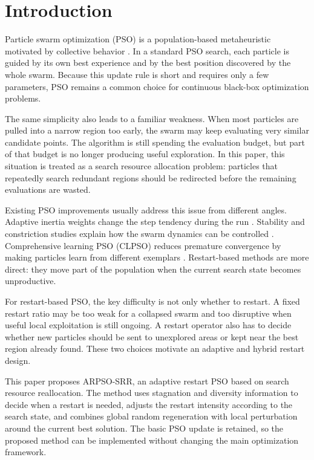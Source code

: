 \documentclass[conference]{IEEEtran}
\begin{document}
\section{Introduction}
Particle swarm optimization (PSO) is a population-based metaheuristic motivated by collective behavior \cite{b1}. In a standard PSO search, each particle is guided by its own best experience and by the best position discovered by the whole swarm. Because this update rule is short and requires only a few parameters, PSO remains a common choice for continuous black-box optimization problems.

The same simplicity also leads to a familiar weakness. When most particles are pulled into a narrow region too early, the swarm may keep evaluating very similar candidate points. The algorithm is still spending the evaluation budget, but part of that budget is no longer producing useful exploration. In this paper, this situation is treated as a search resource allocation problem: particles that repeatedly search redundant regions should be redirected before the remaining evaluations are wasted.

Existing PSO improvements usually address this issue from different angles. Adaptive inertia weights change the step tendency during the run \cite{b2}. Stability and constriction studies explain how the swarm dynamics can be controlled \cite{b3}. Comprehensive learning PSO (CLPSO) reduces premature convergence by making particles learn from different exemplars \cite{b4}. Restart-based methods are more direct: they move part of the population when the current search state becomes unproductive.

For restart-based PSO, the key difficulty is not only whether to restart. A fixed restart ratio may be too weak for a collapsed swarm and too disruptive when useful local exploitation is still ongoing. A restart operator also has to decide whether new particles should be sent to unexplored areas or kept near the best region already found. These two choices motivate an adaptive and hybrid restart design.

This paper proposes ARPSO-SRR, an adaptive restart PSO based on search resource reallocation. The method uses stagnation and diversity information to decide when a restart is needed, adjusts the restart intensity according to the search state, and combines global random regeneration with local perturbation around the current best solution. The basic PSO update is retained, so the proposed method can be implemented without changing the main optimization framework.
\end{document}

